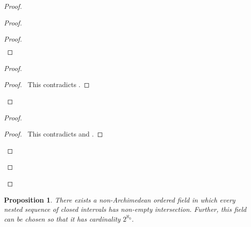 \documentclass{article}
\let\qed\relax
\newtheorem{proposition}[axiom]{Proposition}
\theoremstyle{definition}
\begin{document}
\begin{proof}
\begin{proof}
\begin{proof}
\begin{align*}
                \end{align*}
            \end{proof}
            \begin{proof}
                \qedstep
                \begin{proof}
                    \pf\ This contradicts .
                \end{proof}
            \end{proof}
            \begin{proof}
                \qedstep
                \begin{proof}
                    \pf\ This contradicts  and .
                \end{proof}
            \end{proof}
        \end{proof}
        \qed
    \end{proof}

    \begin{proposition}
        There exists a non-Archimedean ordered field in which every nested sequence of closed intervals has non-empty intersection. Further,
        this field can be chosen so that it has cardinality $2^{\aleph_0}$.
    \end{proposition}
\end{document}
